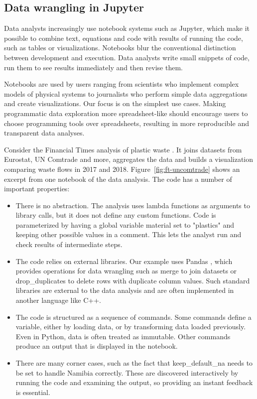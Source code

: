 \documentclass[english,submission]{programming}
\theoremstyle{plain}
\theoremstyle{definition}
\newcommand{\str}[1]{\textnormal{\textcolor{strclr}{\sffamily "#1"}}}
\newcommand{\ident}[1]{\textnormal{\textcolor{idclr}{\sffamily #1}}}
\begin{document}

\subsection{Data wrangling in Jupyter}
\label{sec:background-jupyter}

Data analysts increasingly use notebook systems such as Jupyter, which make it possible to
combine text, equations and code with results of running the code, such as tables or visualizations.
Notebooks blur the conventional distinction between development and execution. Data analysts write
small snippets of code, run them to see results immediately and then revise them.

Notebooks are used by users ranging from scientists who implement complex models of physical
systems to journalists who perform simple data aggregations and create visualizations. Our
focus is on the simplest use cases. Making programmatic data exploration more
spreadsheet-like should encourage users to choose programming tools over spreadsheets, resulting
in more reproducible and transparent data analyses.

Consider the Financial Times analysis of plastic waste \cite{ftnotebooks,ftarticle}. It joins
datasets from Eurostat, UN Comtrade and more, aggregates the data and
builds a visualization comparing waste flows in 2017 and 2018. Figure~\ref{fig:ft-uncomtrade} shows
an excerpt from one notebook of the data analysis. The code has a number of important properties:
%
\begin{itemize}
\item There is no abstraction. The analysis uses lambda functions as arguments to library calls,
  but it does not define any custom functions. Code is parameterized by having a global variable
  \ident{material} set to \str{plastics} and keeping other possible values in a comment.
  This lets the analyst run and check results of intermediate steps.

\item The code relies on external libraries. Our example uses Pandas \cite{pandas},
  which provides operations for data wrangling such as \ident{merge} to join datasets
  or \ident{drop\_duplicates} to delete rows with duplicate column values. Such standard libraries
  are external to the data analysis and are often implemented in another language like C++.

\item The code is structured as a sequence of commands. Some commands define a variable, either by
  loading data, or by transforming data loaded previously. Even in Python, data is often treated
  as immutable. Other commands produce an output that is displayed in the notebook.

\item There are many corner cases, such as the fact that \ident{keep\_default\_na}
  needs to be set to handle Namibia correctly. These are discovered interactively by
  running the code and examining the output, so providing an instant feedback is essential.
\end{itemize}
\end{document}
